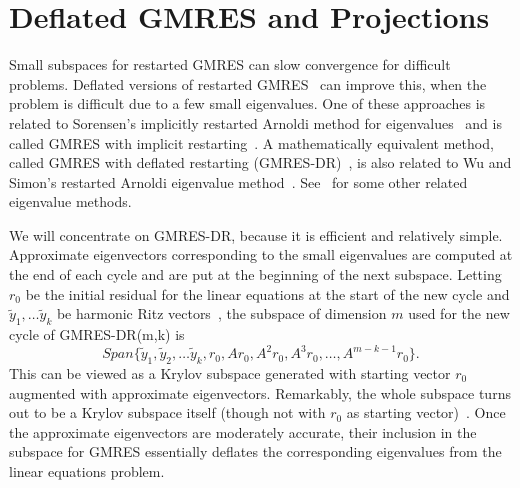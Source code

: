 \documentclass[final]{siamltex}
\begin{document}
\section{Deflated GMRES and Projections}

Small subspaces for restarted GMRES can slow convergence for difficult problems.  Deflated versions of restarted
GMRES~\cite{GMRES-E,KhYe,ErBuPo,ChSa,Sa95B,BaCaGoRe,BuEr,LCMo,DS99,GMRES-IR,
GMRES-DR} can improve this, when the problem is difficult due to a few
small eigenvalues.  One of these approaches is related to Sorensen's
implicitly restarted Arnoldi method for eigenvalues~\cite{So} and is called
GMRES with implicit restarting~\cite{GMRES-IR}.  A mathematically
equivalent method, called GMRES with deflated restarting
(GMRES-DR)~\cite{GMRES-DR}, is also related to Wu and Simon's restarted
Arnoldi eigenvalue method~\cite{WuSi}.  See~\cite{Arnoldi-R,St01,HRAM} for
some other related eigenvalue methods.  

We will concentrate on GMRES-DR, because it is efficient and relatively
simple.  Approximate eigenvectors corresponding to the small eigenvalues are
computed at the end of each cycle and are put at the beginning of the next
subspace.  Letting $r_0$ be the initial residual for the linear equations
at the start of the new cycle and $\tilde y_1, \ldots
\tilde y_k$ be harmonic Ritz vectors~\cite{IE,Fr92,PaPavdV,IEN}, the
subspace of dimension $m$ used for the new cycle of GMRES-DR(m,k) is
\begin{equation}
Span\{\tilde y_1, \tilde y_2, \ldots \tilde y_k, r_0, A r_0, A^2 r_0, A^3
r_0, \ldots ,A^{m-k-1} r_0 \}. \label{ss}
\end{equation}
This can be viewed as a Krylov subspace generated with starting vector
$r_0$ augmented with approximate eigenvectors.  Remarkably, the whole
subspace turns out to be a Krylov subspace itself (though not with $r_0$ as
starting vector)~\cite{GMRES-IR}.
Once the approximate eigenvectors are moderately accurate, their inclusion
in the subspace for GMRES essentially deflates the corresponding
eigenvalues from the linear equations problem.  
\end{document}
